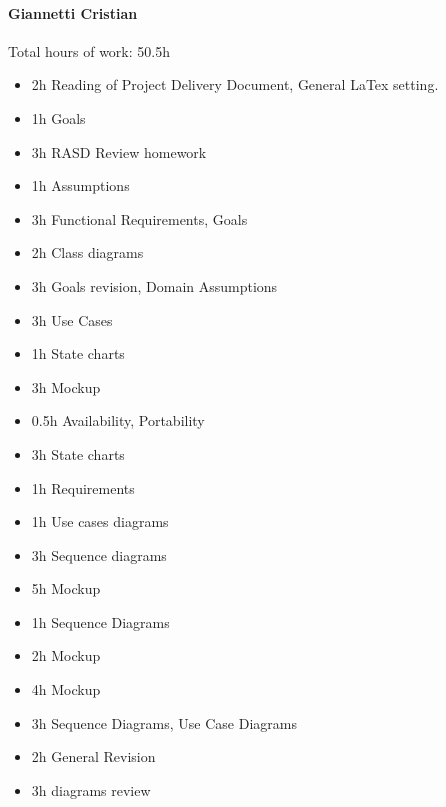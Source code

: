 \documentclass{report}
\begin{document}
		\paragraph{Giannetti Cristian} Total hours of work: 50.5h
			\begin{itemize}
				\item 2h Reading of Project Delivery Document, General LaTex setting.
				\item 1h Goals
				\item 3h RASD Review homework
				\item 1h Assumptions
				\item 3h Functional Requirements, Goals 
				\item 2h Class diagrams
				\item 3h Goals revision, Domain Assumptions
				\item 3h Use Cases
				\item 1h State charts
				\item 3h Mockup
				\item 0.5h Availability, Portability
				\item 3h State charts
				\item 1h Requirements
				\item 1h Use cases diagrams
				\item 3h Sequence diagrams
				\item 5h Mockup
				\item 1h Sequence Diagrams
				\item 2h Mockup
				\item 4h Mockup
				\item 3h Sequence Diagrams, Use Case Diagrams
				\item 2h General Revision
				\item 3h diagrams review
			\end{itemize}
\end{document}
